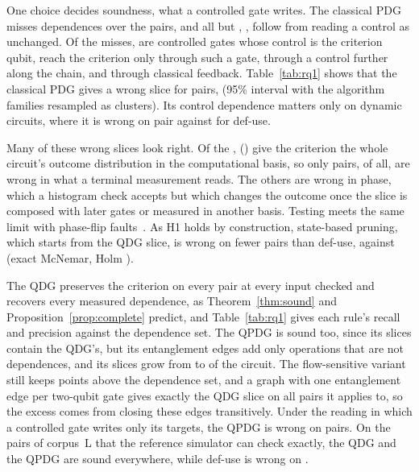 One choice decides soundness, what a controlled gate writes. The classical PDG misses \numCpdgMissTotal{}
dependences over the \numNPairs{} pairs, and all but \numCpdgMissFeedback{}, \numCpdgMissControlPct{}, follow from
reading a control as unchanged. Of the misses, \numCpdgMissSameWire{} are controlled gates whose control is the
criterion qubit, \numCpdgMissKickback{} reach the criterion only through such a gate, \numCpdgMissWritten{} through a
control further along the chain, and \numCpdgMissFeedback{} through classical feedback. Table~\ref{tab:rq1} shows
that the classical PDG gives a wrong slice for \numCpdgUnsound{} pairs, \numCpdgUnsoundPct{} (95\% interval
\numCcCpdgUnsound{} with the \numCcFamilies{} algorithm families resampled as clusters). Its control dependence
matters only on dynamic circuits, where it is wrong on \numCpdgDynamicUnsound{} pair against \numDuDynamicUnsound{}
for def-use.

Many of these wrong slices look right. Of the \numCpdgUnsound{}, \numFdCpdgZMatch{} (\numFdCpdgZMatchPct{}) give the
criterion the whole circuit's outcome distribution in the computational basis, so only \numFdCpdgObservable{} pairs,
\numFdCpdgObservablePct{} of all, are wrong in what a terminal measurement reads. The others are wrong in phase, which
a histogram check accepts but which changes the outcome once the slice is composed with later gates or measured in
another basis. Testing meets the same limit with phase-flip faults~\cite{oldfield2024faster}. As H1 holds by
construction, state-based pruning, which
starts from the QDG slice, is wrong on fewer pairs than def-use, \numRqOneQUnsound{} against \numRqOneDuUnsound{}
(exact McNemar, Holm \numHOnePHolm{}).

The QDG preserves the criterion on every pair at every input checked and recovers every measured dependence, as Theorem~\ref{thm:sound} and
Proposition~\ref{prop:complete} predict, and Table~\ref{tab:rq1} gives each rule's recall and precision against the
dependence set. The QPDG is sound too, since its slices contain the QDG's, but its
entanglement edges add only operations that are not dependences, and its slices grow from \numRqOneLcSize{} to
\numRqOneYzSize{} of the circuit. The flow-sensitive variant still keeps \numYzfExcess{} points above the dependence
set, and a graph with one entanglement edge per two-qubit gate gives exactly the QDG slice on all
\numFdFourEdgeNoClosureEqual{} pairs it applies to, so the excess comes from closing these edges transitively. Under the
reading in which a controlled gate writes only its targets, the QPDG is wrong on \numYzRoUnsound{} pairs. On the
\numCorpusLSoundPairs{} pairs of corpus~L that the reference simulator can check exactly, the QDG and the QPDG are sound everywhere,
while def-use is wrong on \numCorpusLWrongDu{}.

